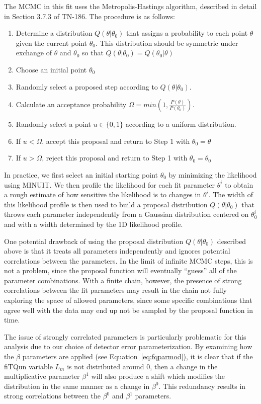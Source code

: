 The MCMC in this fit uses the Metropolis-Hastings algorithm, described
in detail in Section 3.7.3 of TN-186.  The procedure is as follows:
\begin{enumerate}
  \item Determine a distribution $Q(\theta|\theta_{0})$ that assigns a
    probability to each point $\theta$ given the current point $\theta_{0}$.
    This distribution should be symmetric under exchange of $\theta$ and
    $\theta_{0}$ so that $Q(\theta|\theta_{0}) = Q(\theta_{0}|\theta) $
  \item Choose an initial point  $\theta_{0}$
  \item Randomly select a proposed step according to $Q(\theta|\theta_{0})$.
  \item Calculate an acceptance probability $\Omega = min(1,\frac{P(\theta)}{P(\theta_{0})})$.
  \item Randomly select a point $u \in \{0, 1\}$ according to a uniform distribution.
  \item If $u<\Omega$, accept this proposal and return to Step 1 with $\theta_{0} = \theta$ 
  \item If $u>\Omega$, reject this proposal and return to Step 1 with $\theta_{0} = \theta_{0}$ 
\end{enumerate}
In practice, we first select an initial starting point $\theta_{0}$ by
minimizing the likelihood using MINUIT\@.  We then profile the likelihood for
each fit parameter $\theta^{i}$ to obtain a rough estimate of how sensitive the
likelihood is to changes in $\theta^{i}$.  The width of this likelihood profile
is then used to build a proposal distribution $Q(\theta|\theta_{0})$ that
throws each parameter independently from a Gaussian distribution centered on
$\theta^{i}_{0}$ and with a width determined by the 1D likelihood profile.

One potential drawback of using the proposal distribution
$Q(\theta|\theta_{0})$ described above is that it treats all parameters
independently and ignores potential correlations between the parameters.  In
the limit of infinite MCMC steps, this is not a problem, since the proposal
function will eventually ``guess'' all of the parameter combinations.  With a
finite chain, however, the presence of strong correlations between the fit
parameters may result in the chain not fully exploring the space of allowed
parameters, since some specific combinations that agree well with the data may
end up not be sampled by the proposal function in time.

The issue of strongly correlated parameters is particularly problematic for
this analysis due to our choice of detector error parameterization.  By
examining how the $\beta$ parameters are applied (see
Equation~\ref{eq:fqparmod}), it is clear that if the fiTQun variable $L_{m}$ is
not distributed around $0$, then a change in the multiplicative parameter
$\beta^{1}$ will also produce a shift which modifies the distribution in the
same manner as a change in $\beta^{0}$.  This redundancy results in strong
correlations between the $\beta^{0}$ and $\beta^{1}$ parameters.

